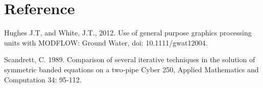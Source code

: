 \documentclass[12pt]{article} %
\begin{document}
\section*{Reference}
\begin{description}

\item Hughes J.T, and White, J.T., 2012. Use of general purpose graphics processing units with MODFLOW: Ground Water, doi: 10.1111/gwat12004. 

\item Scandrett, C. 1989. Comparison of several iterative techniques in the solution of symmetric banded equations on a two-pipe Cyber 250, Applied Mathematics and Computation 34: 95-112.

\end{description}
\end{document}
